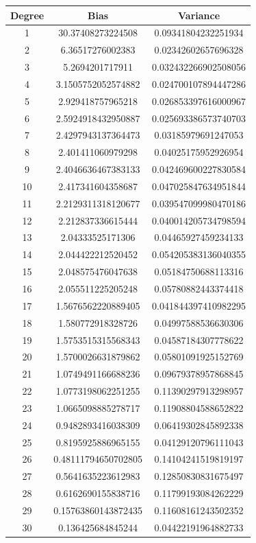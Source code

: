 \documentclass{article}
\begin{document}
\begin{center}
\begin{tabular}{ | c | c | c | }
\hline
Degree & Bias & Variance \\ 
\hline \hline
1 & 30.37408273224508 & 0.09341804232251934 \\ 
\hline
2 & 6.36517276002383 & 0.02342602657696328 \\ 
\hline
3 & 5.2694201717911 & 0.032432266902508056 \\ 
\hline
4 & 3.1505752052574882 & 0.024700107894447286 \\ 
\hline
5 & 2.929418757965218 & 0.026853397616000967 \\ 
\hline
6 & 2.5924918432950887 & 0.025693386573740703 \\ 
\hline
7 & 2.4297943137364473 & 0.03185979691247053 \\ 
\hline
8 & 2.401411060979298 & 0.04025175952926954 \\ 
\hline
9 & 2.4046636467383133 & 0.042469600227830584 \\ 
\hline
10 & 2.417341604358687 & 0.047025847634951844 \\ 
\hline
11 & 2.2129311318120677 & 0.039547099980470186 \\ 
\hline
12 & 2.212837336615444 & 0.040014205734798594 \\ 
\hline
13 & 2.04333525171306 & 0.04465927459234133 \\ 
\hline
14 & 2.044422212520452 & 0.054205383136040355 \\ 
\hline
15 & 2.048575476047638 & 0.05184750688113316 \\ 
\hline
16 & 2.055511225205248 & 0.05780882443374418 \\ 
\hline
17 & 1.5676562220889405 & 0.041844397410982295 \\ 
\hline
18 & 1.580772918328726 & 0.04997588536630306 \\ 
\hline
19 & 1.5753515315568343 & 0.04587184307778622 \\ 
\hline
20 & 1.5700026631879862 & 0.05801091925152769 \\ 
\hline
21 & 1.0749491166688236 & 0.09679378957868845 \\ 
\hline
22 & 1.0773198062251255 & 0.11390297913298957 \\ 
\hline
23 & 1.0665098885278717 & 0.11908804588652822 \\ 
\hline
24 & 0.9482893416038309 & 0.06419302845892338 \\ 
\hline
25 & 0.8195925886965155 & 0.04129120796111043 \\
\hline 
26 & 0.48111794650702805 & 0.14104241519819197 \\ 
\hline
27 & 0.5641635223612983 & 0.12850830831675497 \\ 
\hline
28 & 0.6162690155838716 & 0.11799193084262229 \\ 
\hline
29 & 0.15763860143872435 & 0.11608161243502352 \\ 
\hline
30 & 0.136425684845244 & 0.04422191964882733 \\ 
\hline
\end{tabular}
\end{center}
\end{document}
